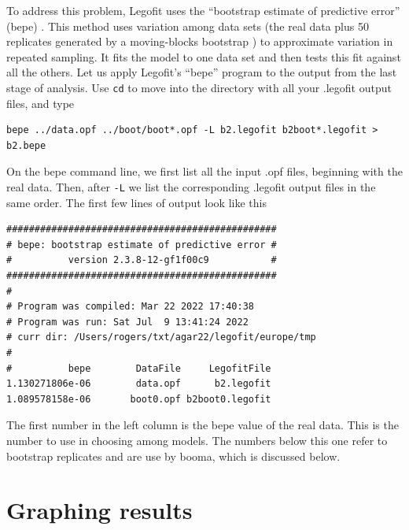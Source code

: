 \documentclass[11pt]{article}
\begin{document}
To address this problem, Legofit uses the ``bootstrap estimate of
predictive error'' (bepe)
\citep{Rogers:BMC-20-526,Efron:JAS-78-316,Efron:IB-93}. This method
uses variation among data sets (the real data plus 50 replicates
generated by a moving-blocks bootstrap \citep{Liu:ELB-92-225}) to
approximate variation in repeated sampling. It fits the model to one
data set and then tests this fit against all the others. Let us apply
Legofit's ``bepe'' program to the output from the last stage of
analysis. Use \texttt{cd} to move into the directory with all your
.legofit output files, and type
\begin{verbatim}
bepe ../data.opf ../boot/boot*.opf -L b2.legofit b2boot*.legofit > b2.bepe
\end{verbatim}
On the bepe command line, we first list all the input .opf files,
beginning with the real data. Then, after \texttt{-L} we list the
corresponding .legofit output files in the same order. The first few
lines of output look like this
\begin{verbatim}
################################################
# bepe: bootstrap estimate of predictive error #
#          version 2.3.8-12-gf1f00c9           #
################################################
#
# Program was compiled: Mar 22 2022 17:40:38
# Program was run: Sat Jul  9 13:41:24 2022
# curr dir: /Users/rogers/txt/agar22/legofit/europe/tmp
#
#          bepe        DataFile     LegofitFile
1.130271806e-06        data.opf      b2.legofit
1.089578158e-06       boot0.opf b2boot0.legofit
\end{verbatim}
The first number in the left column is the bepe value of the real
data. This is the number to use in choosing among models. The numbers
below this one refer to bootstrap replicates and are use by booma,
which is discussed below.

\section{Graphing results}
\label{sec.graph}

\printbibliography
\end{document}
